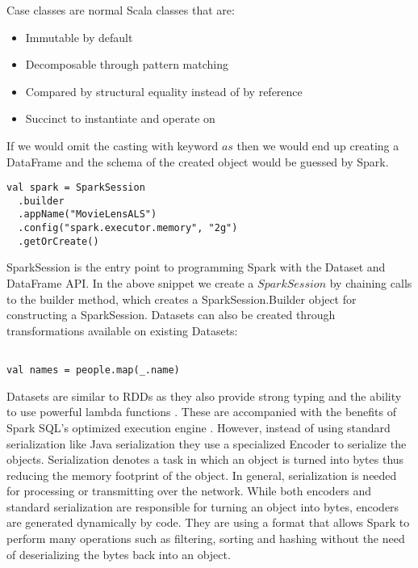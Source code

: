 \documentclass[main.tex]{thesis.tex}
\begin{document}
Case classes are normal Scala classes that are:

\begin{itemize}
	\item Immutable by default
	\item Decomposable through pattern matching
	\item Compared by structural equality instead of by reference
	\item Succinct to instantiate and operate on
\end{itemize}

If we would omit the casting with keyword $as$ then we would end up creating a DataFrame and the schema of the created object would be guessed by Spark.

\begin{lstlisting}[caption=Creating a SparkSession]
val spark = SparkSession
  .builder
  .appName("MovieLensALS")
  .config("spark.executor.memory", "2g")
  .getOrCreate()
\end{lstlisting}

SparkSession is the entry point to programming Spark with the Dataset and DataFrame API. In the above snippet we create a $SparkSession$ by chaining calls to the builder method, which creates a SparkSession.Builder object for constructing a SparkSession. 
Datasets can also be created through transformations available on existing Datasets:

\begin{lstlisting}[caption=Creating a new Dataset through a transformation]

val names = people.map(_.name)

\end{lstlisting}

\cite{spark-dataset}

Datasets are similar to RDDs as they also provide strong typing and the ability to use powerful lambda functions \cite{spark-sql-programming-guide}. These are accompanied with the benefits of Spark SQL's optimized execution engine \cite{spark-sql-programming-guide}. However, instead of using standard serialization like Java serialization they use a specialized Encoder to serialize the objects.
Serialization denotes a task in which an object is turned into bytes thus reducing the memory footprint of the object.
In general, serialization is needed for processing or transmitting over the network.
While both encoders and standard serialization are responsible for turning an object into bytes, encoders are generated dynamically by code. They are using a format that allows Spark to perform many operations such as filtering, sorting and hashing without the need of deserializing the bytes back into an object. \cite{spark-programming-guide}
\end{document}
